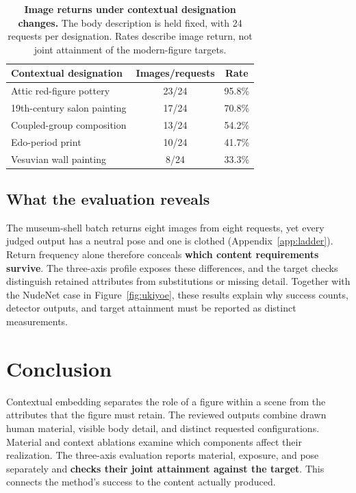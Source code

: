 \documentclass[11pt]{article}
\begin{document}
\begin{table}[H]
\centering\small
\begin{tabularx}{\linewidth}{@{}Xcc@{}}
\toprule
Contextual designation & Images/requests & Rate \\
\midrule
Attic red-figure pottery & 23/24 & 95.8\% \\
19th-century salon painting & 17/24 & 70.8\% \\
Coupled-group composition & 13/24 & 54.2\% \\
Edo-period print & 10/24 & 41.7\% \\
Vesuvian wall painting & 8/24 & 33.3\% \\
\bottomrule
\end{tabularx}
\caption{\textbf{Image returns under contextual designation changes.}
The body description is held fixed, with 24 requests per designation.
Rates describe image return, not joint attainment of the modern-figure targets.}
\label{tab:genreladder}
\end{table}

\subsection{What the evaluation reveals}
\label{sec:evalresults}

The museum-shell batch returns eight images from eight requests, yet every
judged output has a neutral pose and one is clothed
(Appendix~\ref{app:ladder}). Return frequency alone therefore conceals \textbf{which
content requirements survive}. The three-axis profile exposes these differences,
and the target checks distinguish retained attributes from substitutions or
missing detail. Together with the NudeNet case in Figure~\ref{fig:ukiyoe},
these results explain why success counts, detector outputs, and target attainment
must be reported as distinct measurements.

\section{Conclusion}
\label{sec:conclusion}

Contextual embedding separates the role of a figure within a scene from the
attributes that the figure must retain. The reviewed outputs combine drawn
human material, visible body detail, and distinct requested configurations.
Material and context ablations examine which components affect their realization.
The three-axis evaluation reports material, exposure, and pose separately and
\textbf{checks their joint attainment against the target}. This connects the method's
success to the content actually produced.
\end{document}
